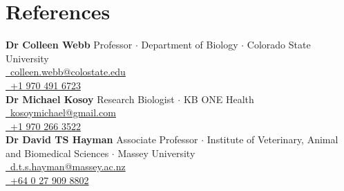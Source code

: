 \documentclass[letterpaper]{deedy-resume} %
\begin{document}

\section{References}
\textbf{Dr Colleen Webb} Professor $\cdot$ Department of Biology $\cdot$ Colorado State University\\
\href{mailto:colleen.webb@colostate.edu}{\Letter~colleen.webb@colostate.edu}\\
\href{tel:+19704916723}{\Mobilefone~+1 970 491 6723}\\

\sectionspace
\textbf{Dr Michael Kosoy} Research Biologist $\cdot$ KB ONE Health\\
\href{mailto:kosoymichael@gmail.com}{\Letter~kosoymichael@gmail.com}\\
\href{tel:+19702663522}{\Mobilefone~+1 970 266 3522}\\

\sectionspace
\textbf{Dr David TS Hayman} Associate Professor $\cdot$ Institute of Veterinary, Animal and Biomedical Sciences $\cdot$ Massey University\\
\href{mailto:d.t.s.hayman@massey.ac.nz}{\Letter~d.t.s.hayman@massey.ac.nz}\\
\href{tel:+640279098802}{\Mobilefone~+64 0 27 909 8802}\\
\end{document}
